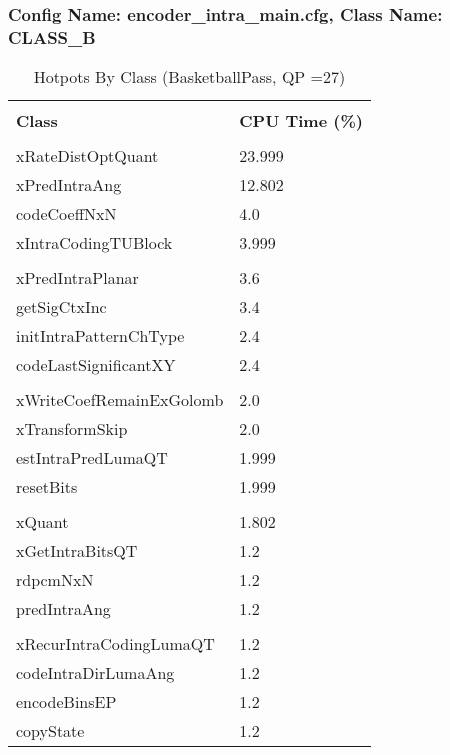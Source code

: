 \documentclass{article}%
\begin{document}
\subsubsection{Config Name: encoder\_intra\_main.cfg, Class Name: CLASS\_B}%
\label{ssubsec:ConfigNameencoderintramain.cfg,ClassNameCLASSB}%
\begin{longtabu}{| X[l] | X[l] |}%
\caption{%
Hotpots By Class (BasketballPass, QP =27)%
}%
\hline%
&\\%
\textbf{Class}&\textbf{CPU Time (\%)}\\%
&\\%
\hline%
\endhead%
xRateDistOptQuant&23.999\\%
\hline%
xPredIntraAng&12.802\\%
\hline%
codeCoeffNxN&4.0\\%
\hline%
xIntraCodingTUBlock&3.999\\%
\hline%
&\\%
\hline%
xPredIntraPlanar&3.6\\%
\hline%
getSigCtxInc&3.4\\%
\hline%
initIntraPatternChType&2.4\\%
\hline%
codeLastSignificantXY&2.4\\%
\hline%
&\\%
\hline%
xWriteCoefRemainExGolomb&2.0\\%
\hline%
xTransformSkip&2.0\\%
\hline%
estIntraPredLumaQT&1.999\\%
\hline%
resetBits&1.999\\%
\hline%
&\\%
\hline%
xQuant&1.802\\%
\hline%
xGetIntraBitsQT&1.2\\%
\hline%
rdpcmNxN&1.2\\%
\hline%
predIntraAng&1.2\\%
\hline%
&\\%
\hline%
xRecurIntraCodingLumaQT&1.2\\%
\hline%
codeIntraDirLumaAng&1.2\\%
\hline%
encodeBinsEP&1.2\\%
\hline%
copyState&1.2\\%
\hline%
\end{longtabu}%
\newpage%
\end{document}
